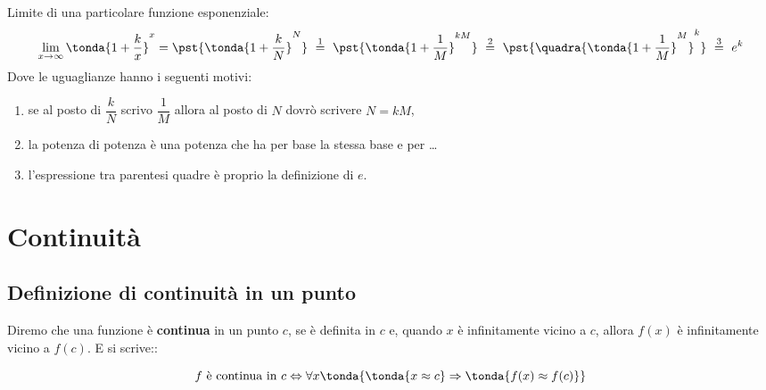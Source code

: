 \begin{esempio}
Limite di una particolare funzione esponenziale:
\begin{align*}
 \lim_{x \rightarrow \infty} \tonda{1+\dfrac{k}{x}}^x =
 \pst{\tonda{1+\dfrac{k}{N}}^N}
~ \stackrel{1}{=} ~  
\pst{\tonda{1+\dfrac{1}{M}}^{kM}}
~ \stackrel{2}{=} ~
\pst{\quadra{\tonda{1+\dfrac{1}{M}}^M}^k}
~ \stackrel{3}{=} ~ e^k
\end{align*}
Dove le uguaglianze hanno i seguenti motivi:
\begin{enumerate} [nosep]
 \item se al posto di \(\dfrac{k}{N}\) scrivo \(\dfrac{1}{M}\) 
allora al posto di \(N\) dovrò scrivere \(N=kM\), 
 \item la potenza di potenza è una potenza che ha per base la stessa base 
e per \dots
 \item l'espressione tra parentesi quadre è proprio la definizione di \(e\).
\end{enumerate}
\end{esempio}


\section{Continuità}
\label{sec:cont_continuita}

\subsection{Definizione di continuità in un punto}
\label{subsec:cont_definizione}


\begin{definizione}
Diremo che una funzione è \textbf{continua} in un punto \(c\), 
se è definita in \(c\) e, 
quando \(x\) è infinitamente vicino a \(c\), 
allora \(f(x)\) è infinitamente vicino a \(f(c)\). E si scrive::

\[f \text{ è continua in } c \Leftrightarrow 
\forall x \tonda{\tonda{x \approx c} \Rightarrow 
\tonda{f(x) \approx f(c)}}\]

\end{definizione}

